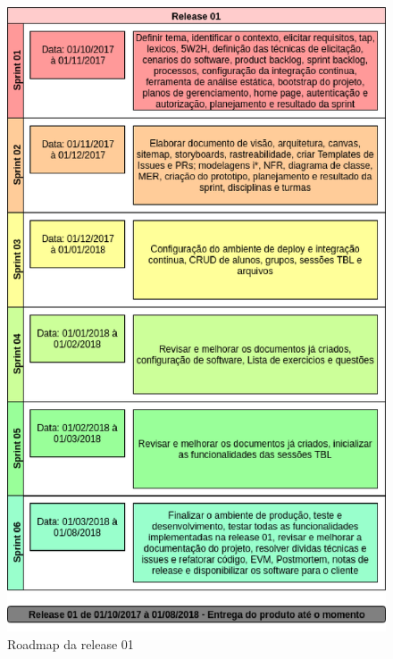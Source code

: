 \begin{apendicesenv}
\begin{figure}[h!]
	\centering
  \includegraphics[keepaspectratio=true,scale=0.8]{figuras/roadmap1.eps}
  \caption{Roadmap da release 01}
	\label{fig:roadmap1}
\end{figure}


\end{apendicesenv}
